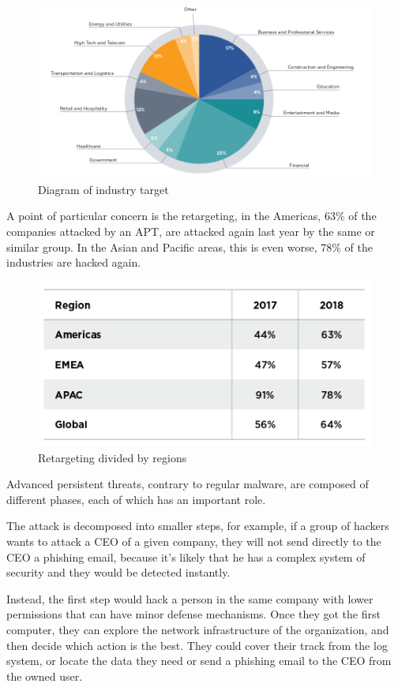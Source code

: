 \begin{figure}[!h]
	\centering
	\includegraphics[width=1.0\columnwidth]{graph}
	\caption{Diagram of industry target}
\end{figure}

A point of particular concern is the retargeting, in the Americas, 63\% of the companies attacked by an APT, are attacked again last year by the same or similar group. In the Asian and Pacific areas, this is even worse, 78\% of the industries are hacked again. \cite{fireeye_mtrends} \\


\begin{figure}[ht!]
	\centering
	\includegraphics[width=0.5\columnwidth]{retarget}
	\caption{Retargeting divided by regions}
\end{figure}

Advanced persistent threats, contrary to regular malware, are composed of different phases, each of which has an important role. 

The attack is decomposed into smaller steps, for example, if a group of hackers wants to attack a CEO of a given company, they will not send directly to the CEO a phishing email, because it's likely that he has a complex system of security and they would be detected instantly. 

Instead, the first step would hack a person in the same company with lower permissions that can have minor defense mechanisms. Once they got the first computer, they can explore the network infrastructure of the organization, and then decide which action is the best.
They could cover their track from the log system, or locate the data they need or send a phishing email to the CEO from the owned user.\\

